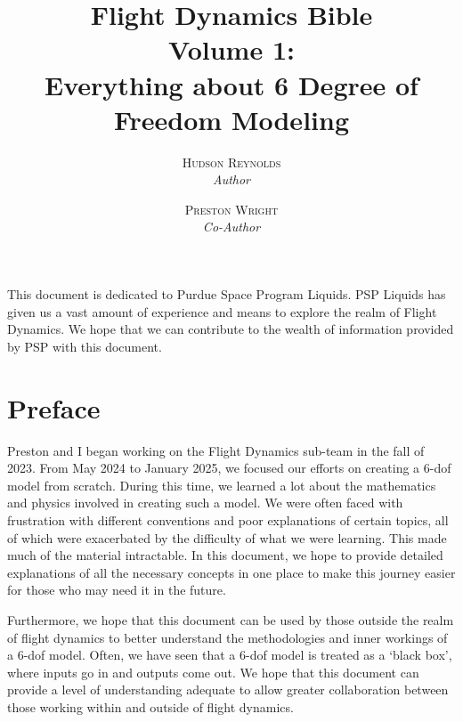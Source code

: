 \documentclass[12pt]{report}
\title{\Huge \textbf{Flight Dynamics Bible}  \\ \huge Volume 1: \\Everything about 6 Degree of Freedom Modeling}
\author{\textsc{Hudson Reynolds} \\ \textit{Author}
\and
\textsc{Preston Wright} \\ \textit{Co-Author}
}
\newenvironment{dedication}
{
   \cleardoublepage
   \thispagestyle{empty}
   \vspace*{\stretch{1}}
   \hfill\begin{minipage}[t]{0.66\textwidth}
   \raggedright
}
{
   \end{minipage}
   \vspace*{\stretch{3}}
   \clearpage
}
\begin{document}
\pagestyle{fancy}
\renewcommand{\chaptermark}[1]{\markboth{#1}{#1}}
\fancyhead[R]{}
\fancyhead[L]{\thechapter\ --\ \leftmark}

\maketitle

%

\begin{dedication}
    This document is dedicated to Purdue Space Program Liquids. PSP Liquids has given us a vast amount of experience and means to explore the realm of Flight Dynamics. We hope that we can contribute to the wealth of information provided by PSP with this document.
\end{dedication}


\begin{spacing}{.5}
    \tableofcontents
    \lstlistoflistings
\end{spacing}


\chapter*{Preface}\label{sec:preface}
Preston and I began working on the Flight Dynamics sub-team in the fall of 2023. From May 2024 to January 2025, we focused our efforts on creating a 6-\gls{dof} model from scratch. During this time, we learned a lot about the mathematics and physics involved in creating such a model. We were often faced with frustration with different conventions and poor explanations of certain topics, all of which were exacerbated by the difficulty of what we were learning. This made much of the material intractable. In this document, we hope to provide detailed explanations of all the necessary concepts in one place to make this journey easier for those who may need it in the future. 

Furthermore, we hope that this document can be used by those outside the realm of flight dynamics to better understand the methodologies and inner workings of a 6-\gls{dof} model. Often, we have seen that a 6-\gls{dof} model is treated as a ‘black box’, where inputs go in and outputs come out. We hope that this document can provide a level of understanding adequate to allow greater collaboration between those working within and outside of flight dynamics.
\end{document}
